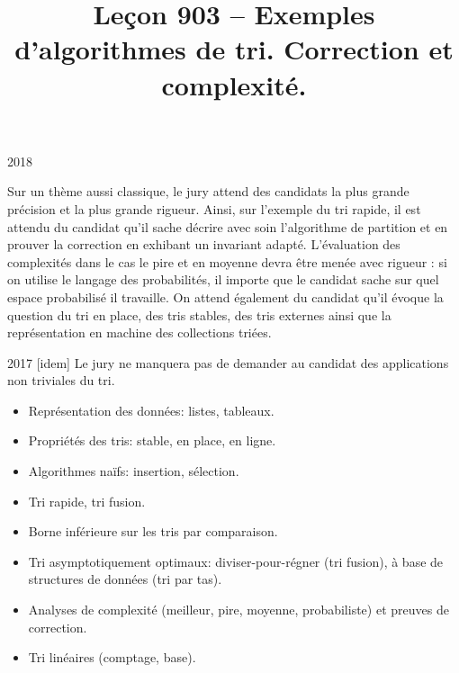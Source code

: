 \documentclass{agregfiche}
\title{Leçon 903 -- Exemples d'algorithmes de tri. Correction et complexité.}
\begin{document}
\maketitle

\secrapports

\begin{rapport}{2018}

	Sur un thème aussi classique, le jury attend des candidats la plus grande précision et la plus grande rigueur.
	Ainsi, sur l'exemple du tri rapide, il est attendu du candidat qu'il sache décrire avec soin l'algorithme de partition et en prouver la correction en exhibant un invariant adapté. L'évaluation des complexités dans le cas le pire et en moyenne devra être menée avec rigueur : si on utilise le langage des probabilités, il importe que le candidat sache sur quel espace probabilisé il travaille.
	On attend également du candidat qu'il évoque la question du tri en place, des tris stables, des tris externes ainsi que la représentation en machine des collections triées.

\end{rapport}

\begin{rapport}{2017}
    [idem]
    Le jury ne manquera pas de demander au candidat des applications non triviales du tri.
\end{rapport}

\secindispensables

\begin{itemize}
    \item Représentation des données: listes, tableaux.
    \item Propriétés des tris: stable, en place, en ligne.
    \item Algorithmes naïfs: insertion, sélection.
   \item Tri rapide, tri fusion.
\end{itemize}

\secasavoir
\begin{itemize}
    \item Borne inférieure sur les tris par comparaison.
    \item Tri asymptotiquement optimaux: diviser-pour-régner (tri fusion), à base de structures de données (tri par tas).
	\item Analyses de complexité (meilleur, pire, moyenne, probabiliste) et preuves de correction.
	\item Tri linéaires (comptage, base).
\end{itemize}
\end{document}
